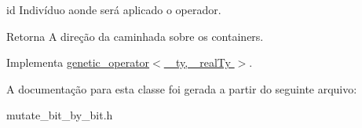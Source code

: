 id Indivíduo aonde será aplicado o operador.

\begin{DoxyReturn}{Retorna}
A direção da caminhada sobre os containers. 
\end{DoxyReturn}


Implementa \hyperlink{classgenetic__operator_a3405bb5335111bd675d408aa8db052fa}{genetic\_\-operator$<$ \_\-ty, \_\-realTy $>$}.



A documentação para esta classe foi gerada a partir do seguinte arquivo:\begin{DoxyCompactItemize}
\item 
mutate\_\-bit\_\-by\_\-bit.h\end{DoxyCompactItemize}
